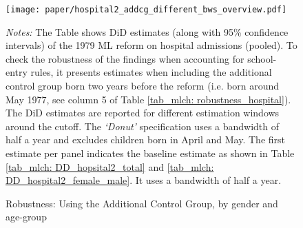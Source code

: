 \begin{landscape}
	\vspace*{\fill}
	\begin{figure}[H]\centering
		\caption{Robustness: Using the Additional Control Group, by gender and age-group}\label{fig_mlch: hospital2_addcg_bws_age-group_gender}
		\texttt{[image: paper/hospital2\_addcg\_different\_bws\_overview.pdf]}
		\scriptsize
		\begin{minipage}{0.95\linewidth}
			\emph{Notes:} The Table shows DiD estimates (along with 95\% confidence intervals) of the 1979 ML reform on hospital admissions (pooled). To check the robustness of the findings when accounting for school-entry rules, it presents estimates when including the additional control group born two years before the reform (i.e. born around May 1977, see column 5 of Table \ref{tab_mlch: robustness_hospital}). The DiD estimates are reported for different estimation windows around the cutoff. The \textit{`Donut'} specification uses a bandwidth of half a year and excludes children born in April and May. The first estimate per panel indicates the baseline estimate as shown in Table \ref{tab_mlch: DD_hopsital2_total} and \ref{tab_mlch: DD_hospital2_female_male}. It uses a bandwidth of half a year.
		\end{minipage}
	\end{figure}
	\vspace*{\fill}\clearpage
\end{landscape}
\restoregeometry 








